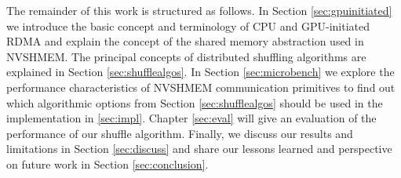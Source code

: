 The remainder of this work is structured as follows. In Section \ref{sec:gpuinitiated} we introduce the basic concept and terminology of CPU and GPU-initiated RDMA and explain the concept of the shared memory abstraction used in NVSHMEM. The principal concepts of distributed shuffling algorithms are explained in Section \ref{sec:shufflealgos}. In Section \ref{sec:microbench} we explore the performance characteristics of NVSHMEM communication primitives to find out which algorithmic options from Section \ref{sec:shufflealgos} should be used in the implementation in \ref{sec:impl}. Chapter \ref{sec:eval} will give an evaluation of the performance of our shuffle algorithm. Finally, we discuss our results and limitations in Section \ref{sec:discuss} and share our lessons learned and perspective on future work in Section \ref{sec:conclusion}.



